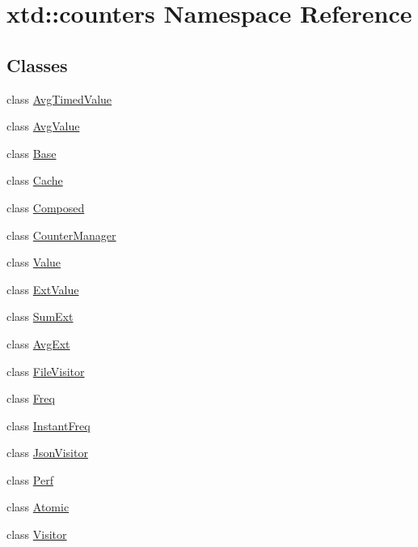\hypertarget{namespacextd_1_1counters}{\section{xtd\-:\-:counters Namespace Reference}
\label{namespacextd_1_1counters}
}
\subsection*{Classes}
\begin{DoxyCompactItemize}
\item 
class \hyperlink{classxtd_1_1counters_1_1AvgTimedValue}{Avg\-Timed\-Value}
\item 
class \hyperlink{classxtd_1_1counters_1_1AvgValue}{Avg\-Value}
\item 
class \hyperlink{classxtd_1_1counters_1_1Base}{Base}
\item 
class \hyperlink{classxtd_1_1counters_1_1Cache}{Cache}
\item 
class \hyperlink{classxtd_1_1counters_1_1Composed}{Composed}
\item 
class \hyperlink{classxtd_1_1counters_1_1CounterManager}{Counter\-Manager}
\item 
class \hyperlink{classxtd_1_1counters_1_1Value}{Value}
\item 
class \hyperlink{classxtd_1_1counters_1_1ExtValue}{Ext\-Value}
\item 
class \hyperlink{classxtd_1_1counters_1_1SumExt}{Sum\-Ext}
\item 
class \hyperlink{classxtd_1_1counters_1_1AvgExt}{Avg\-Ext}
\item 
class \hyperlink{classxtd_1_1counters_1_1FileVisitor}{File\-Visitor}
\item 
class \hyperlink{classxtd_1_1counters_1_1Freq}{Freq}
\item 
class \hyperlink{classxtd_1_1counters_1_1InstantFreq}{Instant\-Freq}
\item 
class \hyperlink{classxtd_1_1counters_1_1JsonVisitor}{Json\-Visitor}
\item 
class \hyperlink{classxtd_1_1counters_1_1Perf}{Perf}
\item 
class \hyperlink{classxtd_1_1counters_1_1Atomic}{Atomic}
\item 
class \hyperlink{classxtd_1_1counters_1_1Visitor}{Visitor}
\end{DoxyCompactItemize}
